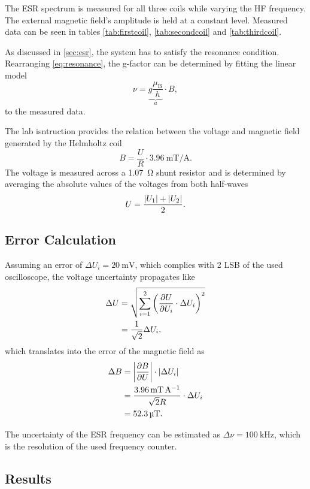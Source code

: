The ESR spectrum is measured for all three coils while varying the HF frequency.
The external magnetic field's amplitude is held at a constant level.
Measured data can be seen in tables \ref{tab:firstcoil}, \ref{tab:secondcoil} and \ref{tab:thirdcoil}.

As discussed in \autoref{sec:esr}, the system has to satisfy the resonance condition.
Rearranging \autoref{eq:resonance}, the g-factor can be determined by fitting the linear model
\begin{equation*}
	\nu=\underbrace{g\frac{\mu_\text{B}}{h}}_a \cdot B,
\end{equation*}
to the measured data.

The lab isntruction provides the relation between the voltage and magnetic field generated by the Helmholtz coil
\begin{equation}\label{eq:extfield}
	B=\frac{U}{R}\cdot\SI{3.96}{\milli\tesla\per\ampere}.
\end{equation}
The voltage is measured across a \SI{1.07}{\ohm} shunt resistor and is determined by averaging the absolute values of the voltages from both half-waves
\begin{equation*}
	U = \frac{\left| U_1 \right|+\left| U_2 \right|}{2}.
\end{equation*}

\subsection{Error Calculation}
Assuming an error of $\Delta U_i=\SI{20}{\mV}$, which complies with 2 LSB of the used oscilloscope, the voltage uncertainty propagates like
\begin{alignat*}{2}
	\Delta U &= \sqrt{\sum^2_{i=1}\left(\frac{\partial U}{\partial U_i}\cdot \Delta U_i\right)^2} \\
	&=\frac{1}{\sqrt{2}}\Delta U_i,
\end{alignat*}
which translates into the error of the magnetic field as
\begin{alignat*}{2}
	\Delta B &= \left| \frac{\partial B}{\partial U} \right|\cdot \left| \Delta U_i \right| \\
	&= \frac{\SI{3.96}{\milli\tesla\per\ampere}}{\sqrt{2}R}\cdot\Delta U_i \\
	&= \SI{52.3}{\micro\tesla}.
\end{alignat*}

The uncertainty of the ESR frequency can be estimated as $\Delta\nu = \SI{100}{\kHz}$, which is the resolution of the used frequency counter.

\subsection{Results}
